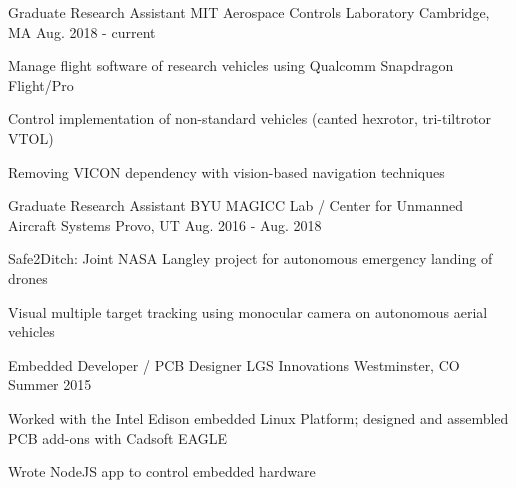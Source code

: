 

\begin{cventries}

  \cventry
    {Graduate Research Assistant} %
    {MIT Aerospace Controls Laboratory} %
    {Cambridge, MA} %
    {Aug. 2018 - current} %
    {
      \begin{cvitems} %
        \item Manage flight software of research vehicles using Qualcomm Snapdragon Flight/Pro
        \item Control implementation of non-standard vehicles (canted hexrotor, tri-tiltrotor VTOL)
        \item Removing VICON dependency with vision-based navigation techniques
      \end{cvitems}
    }

  \cventry
    {Graduate Research Assistant} %
    {BYU MAGICC Lab / Center for Unmanned Aircraft Systems} %
    {Provo, UT} %
    {Aug. 2016 - Aug. 2018} %
    {
      \begin{cvitems} %
        \item Safe2Ditch: Joint NASA Langley project for autonomous emergency landing of drones
        \item Visual multiple target tracking using monocular camera on autonomous aerial vehicles
      \end{cvitems}
    }
    
\cventry
	{Embedded Developer / PCB Designer} %
	{LGS Innovations} %
	{Westminster, CO} %
	{Summer 2015} %
	{
		\begin{cvitems} %
			\item Worked with the Intel Edison embedded Linux Platform; designed and assembled PCB add-ons with Cadsoft EAGLE
			\item Wrote NodeJS app to control embedded hardware
		\end{cvitems}
	}
	

\end{cventries}
